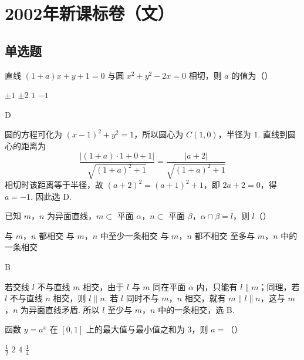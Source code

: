 \chapter{2002年新课标卷（文）}
\section{单选题}
\begin{problem}
直线 \((1 + a)x + y + 1 = 0\) 与圆 \(x^{2} + y^{2} - 2x = 0\) 相切，则 \(a\) 的值为（\quad）

\choices
    {\(\pm 1\)}
    {\(\pm 2\)}
    {\(1\)}
    {\(-1\)}
\end{problem}

\begin{answer}
D
\end{answer}

\begin{solution}
圆的方程可化为 \((x-1)^2+y^2=1\)，所以圆心为 \(C(1,0)\)，半径为 \(1\). 直线到圆心的距离为
\[
\frac{|(1+a)\cdot1+0+1|}{\sqrt{(1+a)^2+1}}=\frac{|a+2|}{\sqrt{(1+a)^2+1}}
\]
相切时该距离等于半径，故 \((a+2)^2=(a+1)^2+1\)，即 \(2a+2=0\)，得 \(a=-1\). 因此选 D.
\end{solution}

\begin{problem}
已知 \(m\)，\(n\) 为异面直线，\(m \subset\) 平面 \(\alpha\)，\(n \subset\) 平面 \(\beta\)，\(\alpha \cap \beta = l\)，则 \(l\)（\quad）

\choices
    {与 \(m\)，\(n\) 都相交}
    {与 \(m\)，\(n\) 中至少一条相交}
    {与 \(m\)，\(n\) 都不相交}
    {至多与 \(m\)，\(n\) 中的一条相交}
\end{problem}

\begin{answer}
B
\end{answer}

\begin{solution}
若交线 \(l\) 不与直线 \(m\) 相交，由于 \(l\) 与 \(m\) 同在平面 \(\alpha\) 内，只能有 \(l\parallel m\)；同理，若 \(l\) 不与直线 \(n\) 相交，则 \(l\parallel n\). 若 \(l\) 同时不与 \(m\)，\(n\) 相交，就有 \(m\parallel l\parallel n\)，这与 \(m\)，\(n\) 为异面直线矛盾. 所以 \(l\) 至少与 \(m\)，\(n\) 中的一条相交，选 B.
\end{solution}

\begin{problem}
函数 \( y = a^x \) 在 \([0,1]\) 上的最大值与最小值之和为 \(3\)，则 \( a = \)（\quad）

\choices
    {\(\frac{1}{2}\)}
    {\(2\)}
    {\(4\)}
    {\(\frac{1}{4}\)}
\end{problem}

